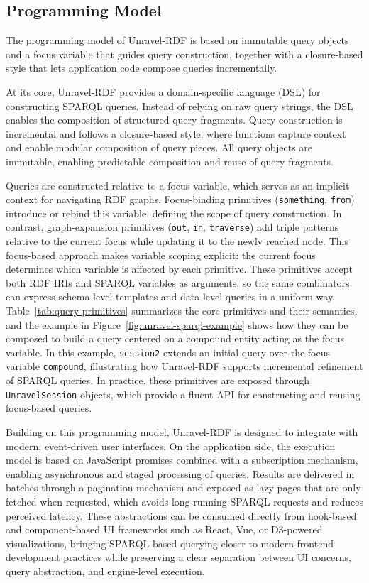 \documentclass[
]{ceurart}
\begin{document}
\subsection{Programming Model}

The programming model of Unravel-RDF is based on immutable query
objects and a focus variable that guides query construction, together
with a closure-based style that lets application code compose queries
incrementally.

At its core, Unravel-RDF provides a domain-specific language (DSL) for
constructing SPARQL queries. Instead of relying on raw query strings,
the DSL enables the composition of structured query fragments. Query
construction is incremental and follows a closure-based style, where
functions capture context and enable modular composition of query
pieces. All query objects are immutable, enabling predictable composition and
reuse of query fragments.

Queries are constructed relative to a focus variable, which serves as
an implicit context for navigating RDF graphs. Focus-binding primitives
(\texttt{something}, \texttt{from}) introduce or rebind this variable,
defining the scope of query construction. In contrast, graph-expansion
primitives (\texttt{out}, \texttt{in}, \texttt{traverse}) add triple
patterns relative to the current focus while updating it to the newly
reached node. This focus-based approach makes variable scoping explicit:
the current focus determines which variable is affected by each
primitive. These primitives accept both RDF IRIs and SPARQL variables as
arguments, so the same combinators can express schema-level templates
and data-level queries in a uniform way. Table~\ref{tab:query-primitives}
summarizes the core primitives and their semantics, and the example in
Figure~\ref{fig:unravel-sparql-example} shows how they can be composed
to build a query centered on a compound entity acting as the focus
variable. In this example, \texttt{session2} extends an initial query
over the focus variable \texttt{compound}, illustrating how Unravel-RDF
supports incremental refinement of SPARQL queries. In practice, these
primitives are exposed through \texttt{UnravelSession} objects, which
provide a fluent API for constructing and reusing focus-based queries.

Building on this programming model, Unravel-RDF is designed to integrate
with modern, event-driven user interfaces. On the application side, the
execution model is based on JavaScript promises combined with a
subscription mechanism, enabling asynchronous and staged processing of
queries. Results are delivered in
batches through a pagination mechanism and exposed as lazy pages that
are only fetched when requested, which avoids long-running SPARQL
requests and reduces perceived latency. These abstractions can be
consumed directly from hook-based and component-based UI frameworks
such as React, Vue, or D3-powered visualizations, bringing SPARQL-based
querying closer to modern frontend development practices while
preserving a clear separation between UI concerns, query abstraction,
and engine-level execution.
\end{document}
